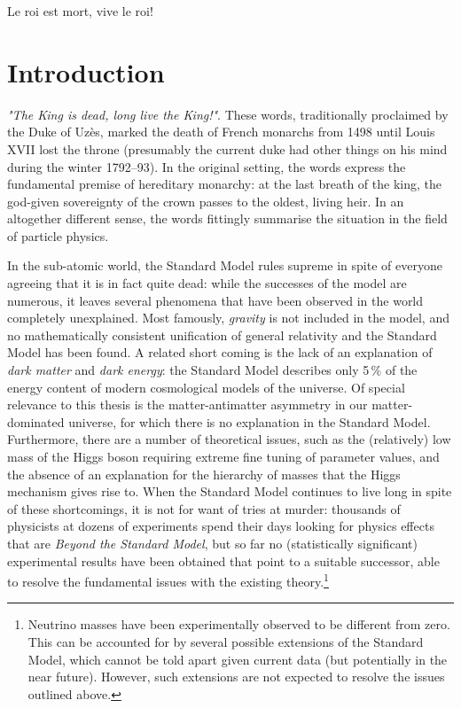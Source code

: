 \begin{savequote}[8cm]
Le roi est mort, vive le roi!
\end{savequote}

\chapter{Introduction}
\label{ch:1-intro} 

\emph{"The King is dead, long live the King!"}. These words, traditionally proclaimed by the Duke of Uzès, marked the death of French monarchs from 1498 until Louis XVII lost the throne (presumably the current duke had other things on his mind during the winter 1792--93). In the original setting, the words express the fundamental premise of hereditary monarchy: at the last breath of the king, the god-given sovereignty of the crown passes to the oldest, living heir. In an altogether different sense, the words fittingly summarise the situation in the field of particle physics.

In the sub-atomic world, the Standard Model rules supreme in spite of everyone agreeing that it is in fact quite dead: while the successes of the model are numerous, it leaves several phenomena that have been observed in the world completely unexplained. Most famously, \emph{gravity} is not included in the model, and no mathematically consistent unification of general relativity and the Standard Model has been found. A related short coming is the lack of an explanation of \emph{dark matter} and \emph{dark energy}: the Standard Model describes only 5\,\% of the energy content of modern cosmological models of the universe. Of special relevance to this thesis is the matter-antimatter asymmetry in our matter-dominated universe, for which there is no explanation in the Standard Model. Furthermore, there are a number of theoretical issues, such as the (relatively) low mass of the Higgs boson requiring extreme fine tuning of parameter values, and the absence of an explanation for the hierarchy of masses that the Higgs mechanism gives rise to.
When the Standard Model continues to live long in spite of these shortcomings, it is not for want of tries at murder: thousands of physicists at dozens of experiments spend their days looking for physics effects that are \emph{Beyond the Standard Model}, but so far no (statistically significant) experimental results have been obtained that point to a suitable successor, able to resolve the fundamental issues with the existing theory.\footnote{Neutrino masses have been experimentally observed to be different from zero. This can be accounted for by several possible extensions of the Standard Model, which cannot be told apart given current data (but potentially in the near future). However, such extensions are not expected to resolve the issues outlined above.} 

